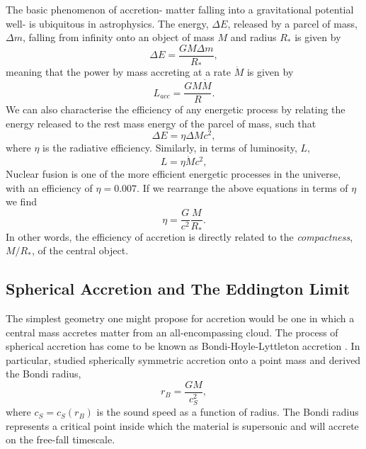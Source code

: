 The basic phenomenon of accretion- matter falling into a gravitational potential well- 
is ubiquitous in astrophysics. The energy, $\Delta E$, released by a parcel of 
mass, $\Delta m$, falling from infinity onto an object of mass $M$ and radius $R_*$
is given by
\begin{equation}
\Delta E = \frac{GM \Delta m}{R_*},
\label{eq:acc_energy}
\end{equation} 
meaning that the power by mass accreting at a rate $\dot{M}$ is given by
\begin{equation}
L_{acc} = \frac{GM \dot{M}}{R}.
\label{eq:acc_energy}
\end{equation} 
We can also characterise the efficiency of any energetic process by relating
the energy released to the rest mass energy of the parcel of mass, such that
\begin{equation}
\Delta E = \eta \Delta M c^2,
\label{eq:restmass}
\end{equation} 
where $\eta$ is the radiative efficiency. Similarly, in terms of luminosity, $L$,
\begin{equation}
L = \eta \dot{M} c^2,
\label{eq:restmass}
\end{equation} 
Nuclear fusion is one of the more efficient
energetic processes in the universe, with an efficiency of
$\eta=0.007$. If we rearrange the above equations in terms of $\eta$ we find
\begin{equation}
\eta = \frac{G}{c^2} \frac{M}{R_*}.
\label{eq:eta}
\end{equation} 
In other words, the efficiency of accretion is directly related 
to the {\em compactness}, $M/R_*$, of the central object. 

\subsection{Spherical Accretion and The Eddington Limit}
\label{sec:eddington}

The simplest geometry one might propose for accretion
would be one in which a central mass accretes matter from
an all-encompassing cloud.
The process of spherical accretion has come to be known as 
Bondi-Hoyle-Lyttleton accretion \citep{hoyle1939,bondi1944}.
In particular, \cite{bondi1952} studied spherically symmetric 
accretion onto a point mass and derived the Bondi radius,
\begin{equation}
r_B = \frac{G M}{c_S^2},
\label{eq:bondi}
\end{equation} 
where $c_S = c_S(r_B)$ is the sound speed as a function of radius.
The Bondi radius represents a critical point inside which the material
is supersonic and will accrete on the free-fall timescale.

